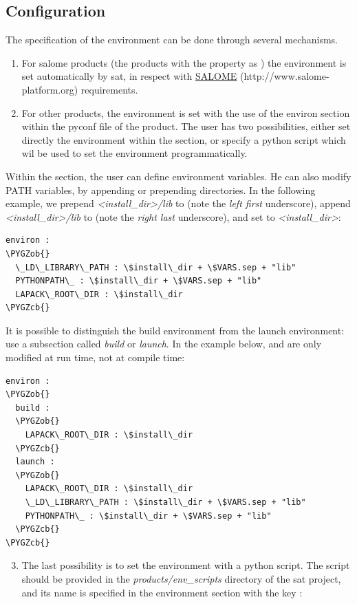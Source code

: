 \documentclass[a4paper,10pt,english]{sphinxmanual}
\def\PYGZob{\char`\{}
\def\PYGZcb{\char`\}}
\begin{document}
\subsection{Configuration}
\label{commands/environ:configuration}
The specification of the environment can be done through several mechanisms.
\begin{enumerate}
\item {} 
For salome products (the products with the property  as ) the environment is set automatically by sat, in respect with \href{http://www.salome-platform.org}{SALOME} (http://www.salome-platform.org) requirements.

\item {} 
For other products, the environment is set with the use of the environ section within the pyconf file of the product. The user has two possibilities, either set directly the environment within the section, or specify a python script which wil be used to set the environment programmatically.

\end{enumerate}

Within the section, the user can define environment variables. He can also modify PATH variables, by appending or prepending directories.
In the following example, we prepend \emph{\textless{}install\_dir\textgreater{}/lib} to  (note the \emph{left first} underscore), append \emph{\textless{}install\_dir\textgreater{}/lib} to  (note the \emph{right last} underscore), and set  to \emph{\textless{}install\_dir\textgreater{}}:

\begin{Verbatim}[commandchars=\\\{\}]
environ :
\PYGZob{}
  \_LD\_LIBRARY\_PATH : \$install\_dir + \$VARS.sep + "lib"
  PYTHONPATH\_ : \$install\_dir + \$VARS.sep + "lib"
  LAPACK\_ROOT\_DIR : \$install\_dir
\PYGZcb{}
\end{Verbatim}

It is possible to distinguish the build environment from the launch environment: use a subsection called \emph{build} or \emph{launch}. In the example below,  and  are only modified at run time, not at compile time:

\begin{Verbatim}[commandchars=\\\{\}]
environ :
\PYGZob{}
  build :
  \PYGZob{}
    LAPACK\_ROOT\_DIR : \$install\_dir
  \PYGZcb{}
  launch :
  \PYGZob{}
    LAPACK\_ROOT\_DIR : \$install\_dir
    \_LD\_LIBRARY\_PATH : \$install\_dir + \$VARS.sep + "lib"
    PYTHONPATH\_ : \$install\_dir + \$VARS.sep + "lib"
  \PYGZcb{}
\PYGZcb{}
\end{Verbatim}
\begin{enumerate}
\setcounter{enumi}{2}
\item {} 
The last possibility is to set the environment with a python script. The script should be provided in the \emph{products/env\_scripts} directory of the sat project, and its name is specified in the environment section with the key :

\end{enumerate}
\end{document}
